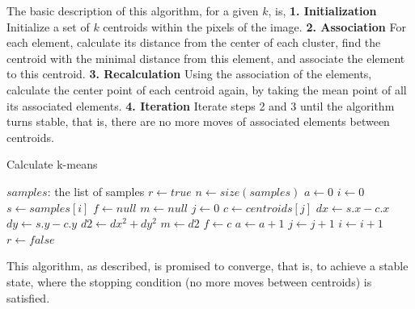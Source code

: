 \documentclass[12pt]{article}
\begin{document}
The basic description of this algorithm, for a given $k$, is, \newline
\textbf{1. Initialization} Initialize a set of $k$ centroids within the pixels of the image. \newline
\textbf{2. Association} For each element, calculate its distance from the center of each cluster, find the centroid with the minimal distance from this element, and associate the element to this centroid. \newline
\textbf{3. Recalculation} Using the association of the elements, calculate the center point of each centroid again, by taking the mean point of all its associated elements. \newline
\textbf{4. Iteration} Iterate steps 2 and 3 until the algorithm turns stable, that is, there are no more moves of associated elements between centroids. \newline

\begin{algorithm}
\caption{Calculate k-means}
\begin{algorithmic} 
\REQUIRE 
\STATE $samples$: the list of samples
\ENSURE 
\STATE $r \leftarrow true$
\STATE $n \leftarrow size(samples)$
\newline
{}
\STATE $a \leftarrow 0$
\newline
\STATE $i \leftarrow 0$
\STATE $s \leftarrow samples[i]$
\newline
\STATE $f \leftarrow null$
\STATE $m \leftarrow null$
\newline
\STATE $j \leftarrow 0$
\STATE $c \leftarrow centroids[j]$
\newline
\STATE $dx \leftarrow s.x - c.x$
\STATE $dy \leftarrow s.y - c.y$
\STATE $d2 \leftarrow dx^2+dy^2$
\newline
{}
\STATE $m \leftarrow d2$
\STATE $f \leftarrow c$
\ENDIF
\newline
{}
\STATE $a \leftarrow a+1$
\ENDIF
\newline
\STATE $j \leftarrow j+1$
\ENDWHILE
\newline
\STATE $i \leftarrow i+1$
\ENDWHILE
\newline
{}
\STATE $r \leftarrow false$
\ENDIF
\newline
\ENDWHILE
\end{algorithmic}
\end{algorithm}

\newpage

This algorithm, as described, is promised to converge, that is, to achieve a stable state, where the stopping condition (no more moves between centroids) is satisfied.
\end{document}
